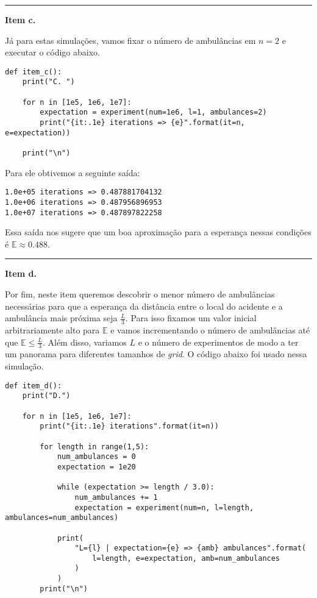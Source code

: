 \documentclass[9.5pt,reqno,a4paper]{amsart}
\begin{document}
\bigskip
\noindent\rule{\textwidth}{0.4pt}
\textbf{Item c.}

Já para estas simulações, vamos fixar o número de ambulâncias em $n=2$ e executar o código abaixo.

\begin{verbatim}
def item_c():
    print("C. ")

    for n in [1e5, 1e6, 1e7]:
        expectation = experiment(num=1e6, l=1, ambulances=2)
        print("{it:.1e} iterations => {e}".format(it=n, e=expectation))

    print("\n")
\end{verbatim}

Para ele obtivemos a seguinte saída:

\begin{verbatim}
1.0e+05 iterations => 0.487881704132
1.0e+06 iterations => 0.487956896953
1.0e+07 iterations => 0.487897822258
\end{verbatim}

Essa saída nos sugere que um boa aproximação para a esperança nessas condições é $\mathbb{E} \approx 0.488$.

\bigskip
\noindent\rule{\textwidth}{0.4pt}
\textbf{Item d.}

Por fim, neste item queremos descobrir o menor número de ambulâncias necessárias para que a esperança da distância entre o local do acidente e a ambulância mais próxima seja $\frac{L}{3}$. Para isso fixamos um valor inicial arbitrariamente alto para $\mathbb{E}$ e vamos incrementando o número de ambulâncias até que $\mathbb{E} \leq \frac{L}{3}$. Além disso, variamos $L$ e o número de experimentos de modo a ter um panorama para diferentes tamanhos de \textit{grid}. O código abaixo foi usado nessa simulação.

\begin{verbatim}
def item_d():
    print("D.")

    for n in [1e5, 1e6, 1e7]:
        print("{it:.1e} iterations".format(it=n))

        for length in range(1,5):
            num_ambulances = 0
            expectation = 1e20

            while (expectation >= length / 3.0):
                num_ambulances += 1
                expectation = experiment(num=n, l=length, ambulances=num_ambulances)

            print(
                "L={l} | expectation={e} => {amb} ambulances".format(
                    l=length, e=expectation, amb=num_ambulances
                )
            )
        print("\n")
\end{verbatim}
\end{document}
